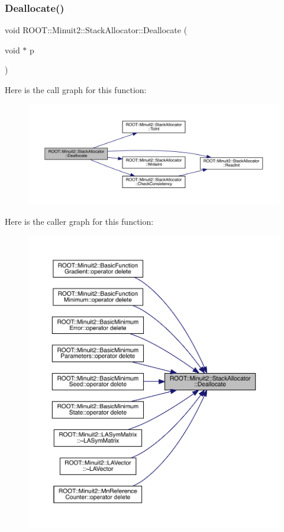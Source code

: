 \subsubsection{\texorpdfstring{Deallocate()}{Deallocate()}\hspace{0.1cm}{\footnotesize\ttfamily [1/3]}}
{\footnotesize\ttfamily void R\+O\+O\+T\+::\+Minuit2\+::\+Stack\+Allocator\+::\+Deallocate (\begin{DoxyParamCaption}\item[{void $\ast$}]{p }\end{DoxyParamCaption})\hspace{0.3cm}{\ttfamily [inline]}}

Here is the call graph for this function\+:
\nopagebreak
\begin{figure}[H]
\begin{center}
\leavevmode
\includegraphics[width=350pt]{d3/d1e/classROOT_1_1Minuit2_1_1StackAllocator_ac36426e01e1474491cef1b203dba2f0c_cgraph}
\end{center}
\end{figure}
Here is the caller graph for this function\+:
\nopagebreak
\begin{figure}[H]
\begin{center}
\leavevmode
\includegraphics[width=350pt]{d3/d1e/classROOT_1_1Minuit2_1_1StackAllocator_ac36426e01e1474491cef1b203dba2f0c_icgraph}
\end{center}
\end{figure}
